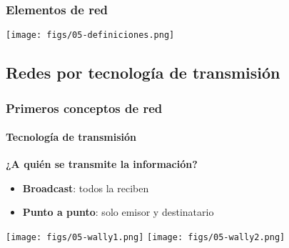 \documentclass[letter]{beamer}
\begin{document}
\begin{frame}
  \frametitle{Elementos de red}

  \begin{center}
    \texttt{[image: figs/05-definiciones.png]}
  \end{center}

\end{frame}


\subsection{Redes por tecnología de transmisión} 

\begin{frame}
  \frametitle{Primeros conceptos de red}
  \framesubtitle{Tecnología de transmisión}

  {\bf ¿A quién se transmite la información?}
  \begin{itemize}
    \item {\bf Broadcast}: todos la reciben
    \item {\bf Punto a punto}: solo emisor y destinatario
  \end{itemize}
  
  \begin{center}
    \texttt{[image: figs/05-wally1.png]}
    \texttt{[image: figs/05-wally2.png]}
  \end{center}
    

\end{frame}
\end{document}
